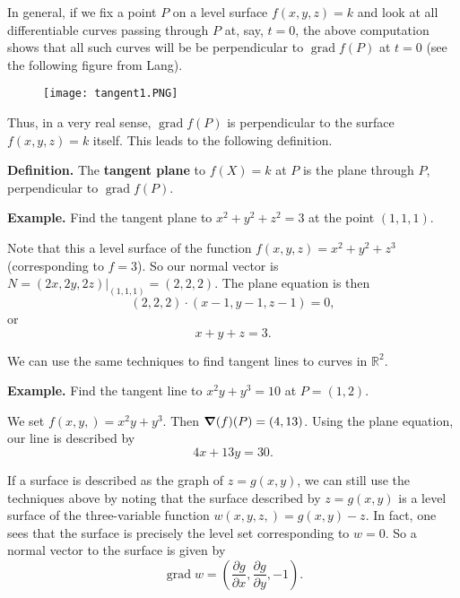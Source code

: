 \documentclass{article}
\DeclareMathOperator{\grd}{grad}
\begin{document}
In general, if we fix a point $P$ on a level surface $f(x,y,z)=k$ and look at all
differentiable curves passing through $P$ at, say, $t=0$, the above computation shows that all such curves
will be be perpendicular to $\grd{f}(P)$ at $t=0$ (see the following figure from Lang).
\begin{figure}[h]
    \centering
    \texttt{[image: tangent1.PNG]}
\end{figure}
Thus, in a very real sense, $\grd f(P)$ is perpendicular to the surface $f(x,y,z)=k$ itself.
This leads to the following definition.

\textbf{Definition.} The \textbf{tangent plane} to $f(X)=k$ at $P$ is the plane through $P$,
perpendicular to $\grd f(P)$.

\textbf{Example.} Find the tangent plane to $x^2+y^2+z^2=3$ at the point $(1,1,1)$. 

Note that this a level surface of the function $f(x,y,z)=x^2+y^2+z^3$ (corresponding to $f=3$). 
So our normal vector is $N = (2x,2y,2z)|_{(1,1,1)} = (2,2,2)$. The plane equation is then
\[(2,2,2)\cdot(x-1,y-1,z-1)=0,\]
or
\[x+y+z=3.\] 

We can use the same techniques to find tangent lines to curves in $\mathbb{R}^2$.

\textbf{Example.} Find the tangent line to $x^2y + y^3 = 10$ at $P=(1,2)$.

We set $f(x,y,)=x^2y+y^3$. Then $\grad(f)(P)=(4,13)$. Using the plane equation, our line is described by 
\[4x+13y=30.\]

If a surface is described as the graph of $z=g(x,y)$, we can still use the techniques above by noting
that the surface described by $z=g(x,y)$ is a level surface of the three-variable function $w(x,y,z,)=g(x,y)-z$.
In fact, one sees that the surface is precisely the level set corresponding to $w=0$. So a normal vector
to the surface is given by
 \[\grd w = \left(\frac{\partial g}{\partial x}, \frac{\partial g}{\partial y},-1\right).\]
\end{document}
